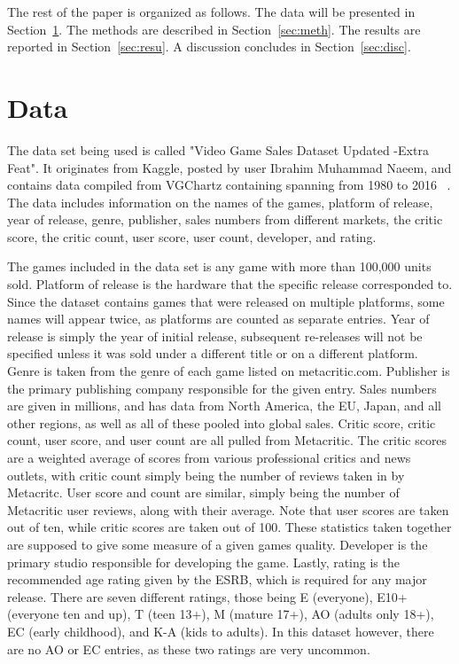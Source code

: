 \documentclass[12pt]{article}
\begin{document}
The rest of the paper is organized as follows.
The data will be presented in Section~\ref{sec:data}.
The methods are described in Section~\ref{sec:meth}.
The results are reported in Section~\ref{sec:resu}.
A discussion concludes in Section~\ref{sec:disc}.


\section{Data}
\label{sec:data}
The data set being used is called "Video Game Sales Dataset Updated -Extra Feat". It originates from Kaggle, posted by user 
Ibrahim Muhammad Naeem, and contains data compiled from VGChartz containing spanning from 1980 to 2016 ~\citep[(D)][]{maindataset}. 
The data includes information on the names of the games, platform of release, year of  release, genre, publisher, sales numbers 
from different markets, the critic score, the critic count, user score, user count, developer, and rating.

The games included in the data set is any game with more than 100,000 units sold. Platform of release is the hardware that the specific release corresponded to. 
Since the dataset contains games that were released on multiple platforms, some names will appear twice, as platforms are counted as separate entries.
Year of release is simply the year of initial release, subsequent re-releases will not be specified unless 
it was sold under a different title or on a different platform. Genre is taken from the genre of each game listed on metacritic.com. 
Publisher is the primary publishing company responsible for the given entry. Sales numbers are given in millions, and has data from North 
America, the EU, Japan, and all other regions, as well as all of these pooled into global sales. Critic score, critic count, user score, and user count are 
all pulled from Metacritic. The critic scores are a weighted average of scores from various professional critics and news outlets, with 
critic count simply being the number of reviews taken in by Metacritc. User score and count are similar, simply being the number of 
Metacritic user reviews, along with their average. Note that user scores are taken out of ten, while critic scores are taken out of 100. These statistics taken together are supposed to give some measure of a given games 
quality. Developer is the primary studio responsible for developing the game. Lastly, rating is the recommended age rating given by 
the ESRB, which is required for any major release. There are seven different ratings, those being E (everyone), E10+ (everyone ten and up), 
T (teen 13+), M (mature 17+), AO (adults only 18+), EC (early childhood), and K-A (kids to adults). In this dataset however, there
are no AO or EC entries, as these two ratings are very uncommon.
\end{document}
